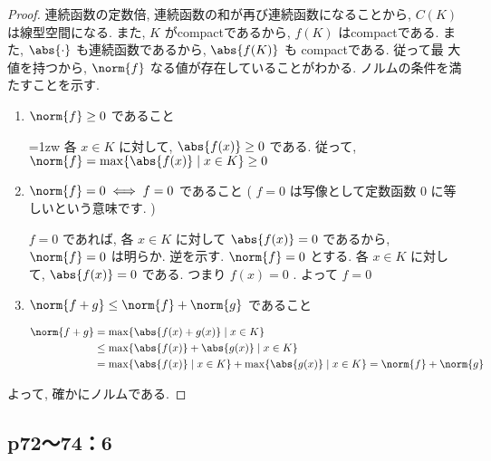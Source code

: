 \documentclass[uplatex,dvipdfmx,a4paper,10pt,fleqn]{jsarticle}
\begin{document}
\begin{leftbar}
	\begin{proof}
	連続函数の定数倍, 連続函数の和が再び連続函数になることから, $C ( K )$ は線型空間になる. また, $K$ がcompactであるから, $f ( K )$ はcompactである. また, $\abs{ \cdot }$ も連続函数であるから, $\abs{ f ( K ) }$ も compactである. 従って最
	大値を持つから, $\norm{ f }$ なる値が存在していることがわかる. ノルムの条件を満たすことを示す. 
		\begin{enumerate}
			\item $\norm{ f } \geq 0$ であること
				
				\parindent=1zw 各 $x \in K$ に対して, $\abs{f ( x ) } \geq 0$ である. 従って, $\norm{ f } = \max \{ \abs{ f ( x )} \mid x \in K \} \geq 0$
				
			\item $\norm{ f } = 0 \iff  f = 0$ であること ( $f = 0$ は写像として定数函数 $0$ に等しいという意味です. )	
				
				$f = 0$ であれば, 各 $x \in K$ に対して $\abs{ f ( x ) } = 0$ であるから, $\norm{ f } = 0$ は明らか. 逆を示す. $\norm{ f } = 0$ とする. 各 $x \in K$ に対して, $\abs{ f ( x ) } = 0$ である. つまり $f ( x ) = 0$ . よって $f = 0$
				
			\item $\norm{ f + g } \leq \norm{ f } + \norm{ g }$ であること
			
				\begin{align*}
					\norm{ f + g } & =  \max \{ \abs{ f ( x ) + g ( x )} \mid x \in K \} \\
					& \leq  \max \{ \abs{ f ( x ) } + \abs{ g ( x ) } \mid x \in K \} \\
					& =  \max \{ \abs{ f ( x ) }  \mid x \in K \} + \max \{ \abs{ g ( x ) }  \mid x \in K \} = \norm{ f } + \norm{ g }
				\end{align*}
		\end{enumerate}
	よって, 確かにノルムである. 
\end{proof}
\end{leftbar}
\newpage

\subsection*{p72〜74：6}
\end{document}
